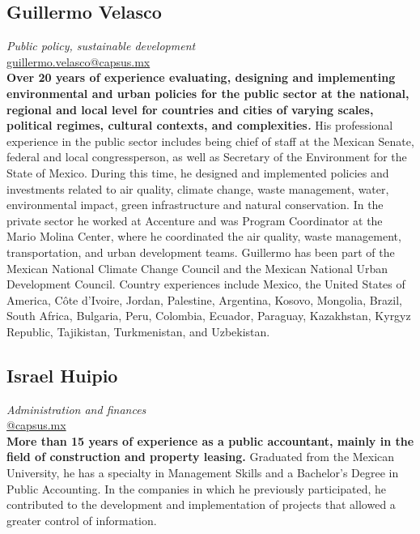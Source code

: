 \documentclass[
	a4paper,
	12pt,
	unnumberedsections,
]{CSSullivanBusinessReport}
\begin{document}
\subsection*{Guillermo Velasco}
\textit{Public policy, sustainable development} \\
\href{mailto:guillermo.velasco@capsus.mx}{guillermo.velasco@capsus.mx} \\[0.5em]
\textbf{Over 20 years of experience evaluating, designing and implementing environmental and urban policies for the public sector at the national, regional and local level for countries and cities of varying scales, political regimes, cultural contexts, and complexities\textit{.}} His professional experience in the public sector includes being chief of staff at the Mexican Senate, federal and local congressperson, as well as Secretary of the Environment for the State of Mexico. During this time, he designed and implemented policies and investments related to air quality, climate change, waste management, water, environmental impact, green infrastructure and natural conservation. In the private sector he worked at Accenture and was Program Coordinator at the Mario Molina Center, where he coordinated the air quality, waste management, transportation, and urban development teams. Guillermo has been part of the Mexican National Climate Change Council and the Mexican National Urban Development Council. Country experiences include Mexico, the United States of America, Côte d’Ivoire, Jordan, Palestine, Argentina, Kosovo, Mongolia, Brazil, South Africa, Bulgaria, Peru, Colombia, Ecuador, Paraguay, Kazakhstan, Kyrgyz Republic, Tajikistan, Turkmenistan, and Uzbekistan.

\subsection*{Israel Huipio}
\textit{Administration and finances} \\
\href{mailto:@capsus.mx}{@capsus.mx} \\[0.5em]
\textbf{More than 15 years of experience as a public accountant, mainly in the field of construction and property leasing.} Graduated from the Mexican University, he has a specialty in Management Skills and a Bachelor's Degree in Public Accounting. In the companies in which he previously participated, he contributed to the development and implementation of projects that allowed a greater control of information.
\end{document}
